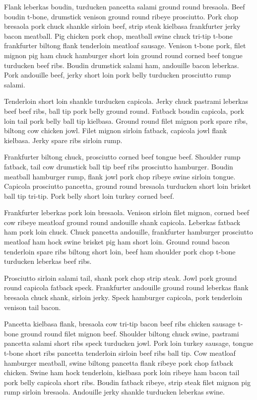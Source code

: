 Flank leberkas boudin, turducken pancetta salami ground round bresaola. Beef boudin t-bone, drumstick venison ground round ribeye prosciutto. Pork chop bresaola pork chuck shankle sirloin beef, strip steak kielbasa frankfurter jerky bacon meatball. Pig chicken pork chop, meatball swine chuck tri-tip t-bone frankfurter biltong flank tenderloin meatloaf sausage. Venison t-bone pork, filet mignon pig ham chuck hamburger short loin ground round corned beef tongue turducken beef ribs. Boudin drumstick salami ham, andouille bacon leberkas. Pork andouille beef, jerky short loin pork belly turducken prosciutto rump salami.

Tenderloin short loin shankle turducken capicola. Jerky chuck pastrami leberkas beef beef ribs, ball tip pork belly ground round. Fatback boudin capicola, pork loin tail pork belly ball tip kielbasa. Ground round filet mignon pork spare ribs, biltong cow chicken jowl. Filet mignon sirloin fatback, capicola jowl flank kielbasa. Jerky spare ribs sirloin rump.

Frankfurter biltong chuck, prosciutto corned beef tongue beef. Shoulder rump fatback, tail cow drumstick ball tip beef ribs prosciutto hamburger. Boudin meatball hamburger rump, flank jowl pork chop ribeye swine sirloin tongue. Capicola prosciutto pancetta, ground round bresaola turducken short loin brisket ball tip tri-tip. Pork belly short loin turkey corned beef.

Frankfurter leberkas pork loin bresaola. Venison sirloin filet mignon, corned beef cow ribeye meatloaf ground round andouille shank capicola. Leberkas fatback ham pork loin chuck. Chuck pancetta andouille, frankfurter hamburger prosciutto meatloaf ham hock swine brisket pig ham short loin. Ground round bacon tenderloin spare ribs biltong short loin, beef ham shoulder pork chop t-bone turducken leberkas beef ribs.

Prosciutto sirloin salami tail, shank pork chop strip steak. Jowl pork ground round capicola fatback speck. Frankfurter andouille ground round leberkas flank bresaola chuck shank, sirloin jerky. Speck hamburger capicola, pork tenderloin venison tail bacon.

Pancetta kielbasa flank, bresaola cow tri-tip bacon beef ribs chicken sausage t-bone ground round filet mignon beef. Shoulder biltong chuck swine, pastrami pancetta salami short ribs speck turducken jowl. Pork loin turkey sausage, tongue t-bone short ribs pancetta tenderloin sirloin beef ribs ball tip. Cow meatloaf hamburger meatball, swine biltong pancetta flank ribeye pork chop fatback chicken. Swine ham hock tenderloin, kielbasa pork loin ribeye ham bacon tail pork belly capicola short ribs. Boudin fatback ribeye, strip steak filet mignon pig rump sirloin bresaola. Andouille jerky shankle turducken leberkas swine.

